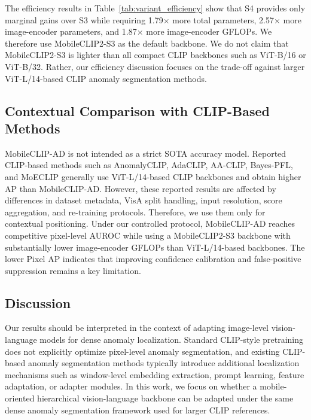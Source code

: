 \documentclass[10pt]{article}
\begin{document}
The efficiency results in Table~\ref{tab:variant_efficiency} show that S4 provides only marginal gains over S3 while requiring 1.79$\times$ more total parameters, 2.57$\times$ more image-encoder parameters, and 1.87$\times$ more image-encoder GFLOPs. We therefore use MobileCLIP2-S3 as the default backbone. We do not claim that MobileCLIP2-S3 is lighter than all compact CLIP backbones such as ViT-B/16 or ViT-B/32. Rather, our efficiency discussion focuses on the trade-off against larger ViT-L/14-based CLIP anomaly segmentation methods.

\subsection{Contextual Comparison with CLIP-Based Methods}

MobileCLIP-AD is not intended as a strict SOTA accuracy model. Reported CLIP-based methods such as AnomalyCLIP, AdaCLIP, AA-CLIP, Bayes-PFL, and MoECLIP generally use ViT-L/14-based CLIP backbones and obtain higher AP than MobileCLIP-AD. However, these reported results are affected by differences in dataset metadata, VisA split handling, input resolution, score aggregation, and re-training protocols. Therefore, we use them only for contextual positioning. Under our controlled protocol, MobileCLIP-AD reaches competitive pixel-level AUROC while using a MobileCLIP2-S3 backbone with substantially lower image-encoder GFLOPs than ViT-L/14-based backbones. The lower Pixel AP indicates that improving confidence calibration and false-positive suppression remains a key limitation.


\subsection{Discussion}

Our results should be interpreted in the context of adapting image-level vision-language models for dense anomaly localization. Standard CLIP-style pretraining does not explicitly optimize pixel-level anomaly segmentation, and existing CLIP-based anomaly segmentation methods typically introduce additional localization mechanisms such as window-level embedding extraction, prompt learning, feature adaptation, or adapter modules. In this work, we focus on whether a mobile-oriented hierarchical vision-language backbone can be adapted under the same dense anomaly segmentation framework used for larger CLIP references.
\end{document}
